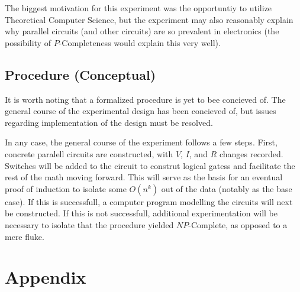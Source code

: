 \documentclass{article}
\begin{document}
The biggest motivation for this experiment was the opportuntiy to utilize Theoretical Computer Science, but the experiment may also reasonably explain why parallel circuits (and other circuits) are so prevalent in electronics (the possibility of $P$-Completeness would explain this very well).
\subsection{Procedure (Conceptual)}
It is worth noting that a formalized procedure is yet to bee concieved of. The general course of the experimental design has been concieved of, but issues regarding implementation of the design must be resolved.

In any case, the general course of the experiment follows a few steps. First, concrete paralell circuits are constructed, with $V$, $I$, and $R$ changes recorded. Switches will be added to the circuit to construt logical gatess and facilitate the rest of the math moving forward. This will serve as the basis for an eventual proof of induction to isolate some $O(n^{k})$ out of the data (notably as the base case). If this is successfull, a computer program modelling the circuits will next be constructed. If this is not successfull, additional experimentation will be necessary to isolate that the procedure yielded $NP$-Complete, as opposed to a mere fluke.
\section{Appendix} 

\begin{center}
	\begin{circuitikz}
		
	\end{circuitikz}
\end{center}
\medskip



\end{document}
